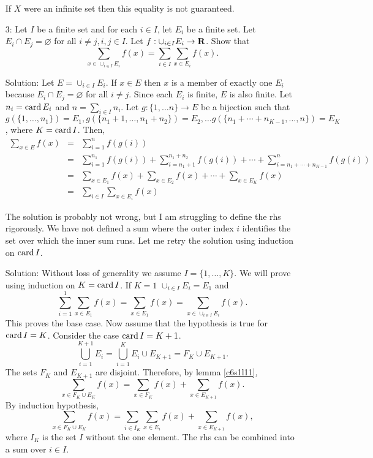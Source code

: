 \begin{enumerate}
\begin{rem}
If $X$ were an infinite set then this equality is not guaranteed.
\end{rem}

\item[3:] Let $I$ be a finite set and for each $i \in I$, let $E_i$ be a
finite set. Let $E_i \cap E_j = \varnothing$ for all $i \ne j, i, j \in I$.
Let $f: \cup_{i \in I}E_i \rightarrow \mathbf{R}$. Show that
\[
\sum_{x \in \cup_{i \in I} E_i}f(x) = \sum_{i \in I}\sum_{x \in E_i} f(x).
\]
\item[Solution:] Let $E = \cup_{i \in I}E_i$. If $x \in E$ then $x$ is a
member of exactly one $E_i$ because $E_i \cap E_j = \varnothing$ for all
$i \ne j$. Since each $E_i$ is finite, $E$ is also finite. Let $n_i = \operatorname{card}
E_i$ and $n = \sum_{i \in I}n_i$. Let $g: \{1, \ldots n\} \rightarrow E$ be
a bijection such that $g(\{1, \ldots, n_1\}) = E_1, g(\{n_1 + 1, \ldots,
n_1 + n_2\}) = E_2, \ldots g(\{n_1 + \cdots + n_{K-1}, \ldots, n\}) = E_K$,
where $K = \operatorname{card} I$. Then,
\begin{eqnarray*}
\sum_{x \in E} f(x) &=& \sum_{i=1}^n f(g(i)) \\
 &=& \sum_{i=1}^{n_1} f(g(i)) + \sum_{i=n_1+1}^{n_1+n_2} f(g(i)) + \cdots
    + \sum_{i=n_1 + \cdots + n_{K-1}}^n f(g(i)) \\
 &=& \sum_{x \in E_1} f(x) + \sum_{x \in E_2}f(x) + \cdots + 
     \sum_{x \in E_K} f(x) \\
 &=& \sum_{i \in I} \sum_{x \in E_i} f(x)
\end{eqnarray*}

\begin{rem}
The solution is probably not wrong, but I am struggling to define the rhs
rigorously. We have not defined a sum where the outer index $i$ identifies
the set over which the inner sum runs. Let me retry the solution using 
induction on $\operatorname{card} I$.
\end{rem}

\item[Solution:] Without loss of generality we assume $I = 
\{1, \ldots, K\}$.
We will prove using induction on $K = \operatorname{card} I$. If $K = 1$
$\cup_{i \in I}E_i = E_1$ and 
\[
\sum_{i=1}^1 \sum_{x \in E_1}f(x) = \sum_{x \in E_1}f(x) = \sum_{x \in 
\cup_{i \in I}E_i} f(x).
\]
This proves the base case. Now assume that the hypothesis is true for 
$\operatorname{card} I = K$. Consider the case $\operatorname{card} I = K + 1$. 
\[
\bigcup_{i=1}^{K + 1} E_i = \bigcup_{i=1}^K E_i \cup E_{K+1} = F_K \cup
E_{K+1}.
\]
The sets $F_K$ and $E_{K+1}$ are disjoint. Therefore, by lemma 
\ref{c6s1l11},
\[
\sum_{x \in F_K \cup E_K} f(x) = \sum_{x \in F_K}f(x) + \sum_{x \in E_{K+1}}
f(x).
\]
By induction hypothesis,
\[
\sum_{x \in F_K \cup E_K} f(x) = \sum_{i \in I_K}\sum_{x \in E_i}f(x) + 
\sum_{x \in E_{K+1}} f(x),
\]
where $I_K$ is the set $I$ without the one element. The rhs can be combined
into a sum over $i \in I$.


\end{enumerate}
